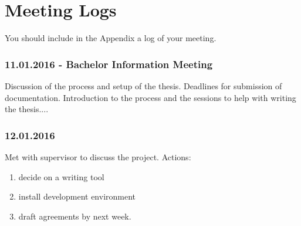 \chapter{Meeting Logs}
You should include in the Appendix a log of your meeting.

\subsection{11.01.2016 - Bachelor Information Meeting}
Discussion of the process and setup of the thesis.  Deadlines for submission of documentation.  Introduction to the process and the sessions to help with writing the thesis....

\subsection{12.01.2016}
Met with supervisor to discuss the project. Actions:
\begin{enumerate}
	\item decide on a writing tool
	\item install development environment
	\item draft agreements by next week.
\end{enumerate}



